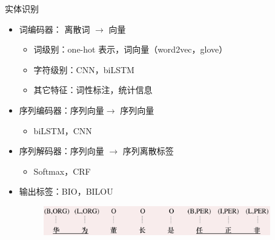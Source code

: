 \documentclass{beamer}
\begin{document}
\begin{frame}{实体识别}
    \begin{itemize}
        \item 词编码器： 离散词 $\rightarrow$ 向量
            \begin{itemize}
                \item 词级别：one-hot 表示，词向量（word2vec，glove）
                \item 字符级别：CNN，biLSTM
                \item 其它特征：词性标注，统计信息
            \end{itemize}
        \item 序列编码器：序列向量$\rightarrow$ 序列向量
            \begin{itemize}
                \item  biLSTM，CNN
            \end{itemize}
        \item 序列解码器：序列向量 $\rightarrow$ 序列离散标签
            \begin{itemize}
                \item  Softmax，CRF
            \end{itemize}
        \item 输出标签：BIO，BILOU
            \begin{figure}[t]
                \begin{center}
                    \includegraphics[width=3.9in]{images/entity}
                \end{center}
            \end{figure}
    \end{itemize}
\end{frame}
\end{document}
